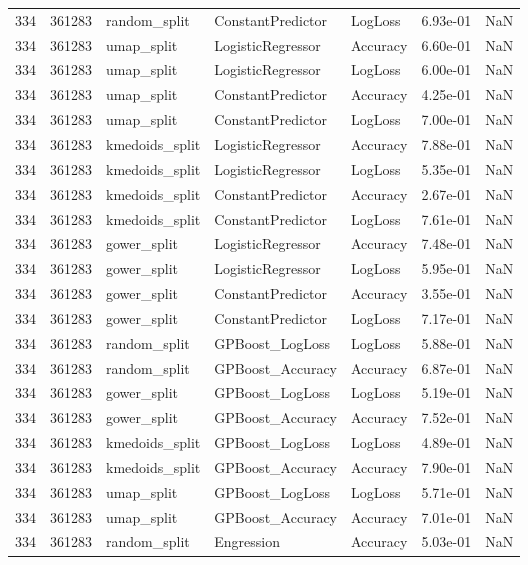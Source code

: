 \begin{tabular}{rrlllrr}
334 & 361283 & random\_split & ConstantPredictor & LogLoss & 6.93e-01 & NaN \\
334 & 361283 & umap\_split & LogisticRegressor & Accuracy & 6.60e-01 & NaN \\
334 & 361283 & umap\_split & LogisticRegressor & LogLoss & 6.00e-01 & NaN \\
334 & 361283 & umap\_split & ConstantPredictor & Accuracy & 4.25e-01 & NaN \\
334 & 361283 & umap\_split & ConstantPredictor & LogLoss & 7.00e-01 & NaN \\
334 & 361283 & kmedoids\_split & LogisticRegressor & Accuracy & 7.88e-01 & NaN \\
334 & 361283 & kmedoids\_split & LogisticRegressor & LogLoss & 5.35e-01 & NaN \\
334 & 361283 & kmedoids\_split & ConstantPredictor & Accuracy & 2.67e-01 & NaN \\
334 & 361283 & kmedoids\_split & ConstantPredictor & LogLoss & 7.61e-01 & NaN \\
334 & 361283 & gower\_split & LogisticRegressor & Accuracy & 7.48e-01 & NaN \\
334 & 361283 & gower\_split & LogisticRegressor & LogLoss & 5.95e-01 & NaN \\
334 & 361283 & gower\_split & ConstantPredictor & Accuracy & 3.55e-01 & NaN \\
334 & 361283 & gower\_split & ConstantPredictor & LogLoss & 7.17e-01 & NaN \\
334 & 361283 & random\_split & GPBoost\_LogLoss & LogLoss & 5.88e-01 & NaN \\
334 & 361283 & random\_split & GPBoost\_Accuracy & Accuracy & 6.87e-01 & NaN \\
334 & 361283 & gower\_split & GPBoost\_LogLoss & LogLoss & 5.19e-01 & NaN \\
334 & 361283 & gower\_split & GPBoost\_Accuracy & Accuracy & 7.52e-01 & NaN \\
334 & 361283 & kmedoids\_split & GPBoost\_LogLoss & LogLoss & 4.89e-01 & NaN \\
334 & 361283 & kmedoids\_split & GPBoost\_Accuracy & Accuracy & 7.90e-01 & NaN \\
334 & 361283 & umap\_split & GPBoost\_LogLoss & LogLoss & 5.71e-01 & NaN \\
334 & 361283 & umap\_split & GPBoost\_Accuracy & Accuracy & 7.01e-01 & NaN \\
334 & 361283 & random\_split & Engression & Accuracy & 5.03e-01 & NaN \\

\end{tabular}
